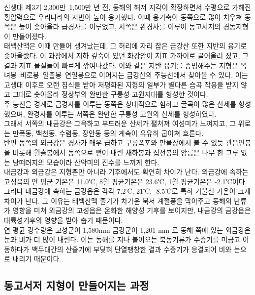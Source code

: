 \documentclass[12pt,a4paper]{book}
\newcommand{\SubSectionMargin}		{\newpage  \null \vskip 0cm}
\begin{document}
신생대 제3기 2,300만~1,500만 년 전, 동해의 해저 지각이 확장하면서 수평으로 가해진 횡압력으로 우리나라의 지반이 높이 융기했다. 이때 융기축이 동쪽으로 많이 치우쳐 동쪽은 높이 솟아올라 급경사를 이루었고, 서쪽은 완경사를 이루어 동고서저의 경동지형이 만들어졌다.
\\[-1.0em]

태백산맥은 이때 만들어 생겨났는데, 그 허리에 자리 잡은 금강산 또한 지반의 융기로 솟아올랐다. 이 과장에서 지하 깊숙이 있던 화강암이 지표 가까이로 끌어올려 졌고, 그 결과 지표 물질들이 빠르게 깎여나갔다. 이와 같은 지반 융기를 증명해주는 지형은 옥녀봉~비로봉~일출봉~연일봉으로 이어지는 금강산의 주능선에서 찾아볼 수 있다. 이는 고생대 이후로 오랜 침식을 받아 저평화된 지형의 일부가 별다른 습곡 작용을 받지 않고 그대로 솟아올라 정상부의 완만한 구릉성 고원지대를 형성한 것이다. 
\\[-1.0em]

주 능선을 경계로 급경사를 이루는 동쪽은 상대적으로 험하고 굴곡이 많은 산세를 형성했으며, 완경사를 이루는 서쪽은 완만한 구릉성 고원의 산세를 형성하였다. 
\\[-1.0em]

그래서 서쪽의 내금강은 그윽하고 부드러운 산세가 펼쳐져 여성미가 느껴지고, 그 위로는 만폭동, 백천동, 수렴동, 장안동 등의 계속이 유유히 굽이쳐 흐른다.
\\[-1.0em]

반면 동쪽의 외금강은 경사가 매우 급하고 구룡폭포와 만물상에서 볼 수 있듯 관음연봉을 비롯해 월출봉에서 동쪽으로 뻗어 내린 채하봉과 집선봉의 암릉은 나무 한 그루 없는 낭떠러지의 모습이라 산악미의 진수를 느끼게 한다.
\\[-1.0em]
 
내금강과 외금강은 지형뿐만 아니라 기후에서도 확연히 차이가 난다. 외금강에 속하는 고성읍의 연 평균 기온은 11.0℃, 8월 평균기온은 23.6℃, 1월 평균기온은 -2.1℃이다. 그러나 내금강에 속하는 금강읍은 각각 7.2℃, 21℃, -8.5℃로 특히 겨울철 기온이 크게 차이가 난다. 그 이유는 태백산맥 줄기가 차가운 북서 계절풍을 막아주고 동해의 난류가 영향을 미쳐 외금강의 고성읍은 온화한 해양성 기후를 보이지만, 내금강의 금강읍은 대륙성기후의 영향을 받아 춥기 때문이다.
\\[-1.0em]

연 평균 강수량은 고성군이 1,580mm 금강군이 1,201 mm 로 동해 쪽에 있는 외금강은 눈과 비가 더 많이 내린다. 이는 동해를 지나 불어오는 북동기류가 수증기를 머금고 이동하다가 백두대간의 산줄기에 부딪혀 단열팽창한 결과 수증기가 응결되어 비와 눈으로 내리기 때문이다.


	\SubSectionMargin
	\subsection{동고서저 지형이 만들어지는 과정}
\end{document}
